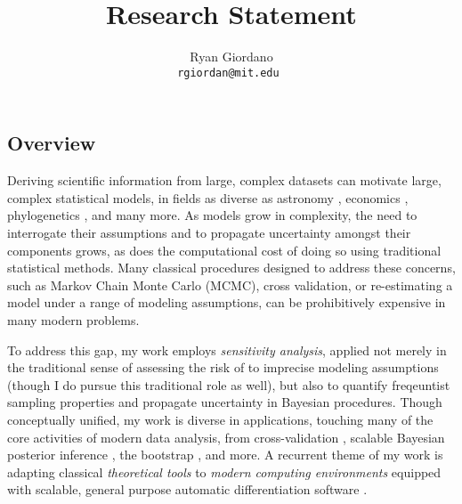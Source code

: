 

\title{Research Statement}

\author{
  Ryan Giordano \\ \texttt{rgiordan@mit.edu }
}




\subsection*{Overview}

Deriving scientific information from large, complex datasets can motivate large,
complex statistical models, in fields as diverse as astronomy
\citep{regier:2019:cataloging}, economics \citep{meager:2019:microcredit},
phylogenetics \citep{pritchard:2000:inference}, and many more.  As models grow
in complexity, the need to interrogate their assumptions and to propagate
uncertainty amongst their components grows, as does the computational
cost of doing so using traditional statistical methods. Many classical
procedures designed to address these concerns, such as Markov Chain Monte Carlo
(MCMC), cross validation, or re-estimating a model under a range of
modeling assumptions, can be prohibitively expensive in many modern problems.

To address this gap, my work employs {\em sensitivity analysis}, applied not
merely in the traditional sense of assessing the risk of to imprecise modeling
assumptions (though I do pursue this traditional role as well), but also to
quantify freqeuntist sampling properties and propagate uncertainty in Bayesian
procedures. Though conceptually unified, my work is diverse in applications,
touching many of the core activities of modern data analysis, from
cross-validation \citep{giordano:2019:ij, giordano2019:hoij}, scalable Bayesian
posterior inference \citep{giordano:2018:covariances,
giordano:2018:bnpsensitivity}, the bootstrap \citep{giordano:2020:bayesij}, and
more. A recurrent theme of my work is adapting classical {\em theoretical tools}
\citep{reeds:1976:thesis, gustafson:1996:localposterior} to {\em modern
computing environments} equipped with scalable, general purpose automatic
differentiation software \citep{baydin:2015:automatic, carpenter:2015:stanmath}.


